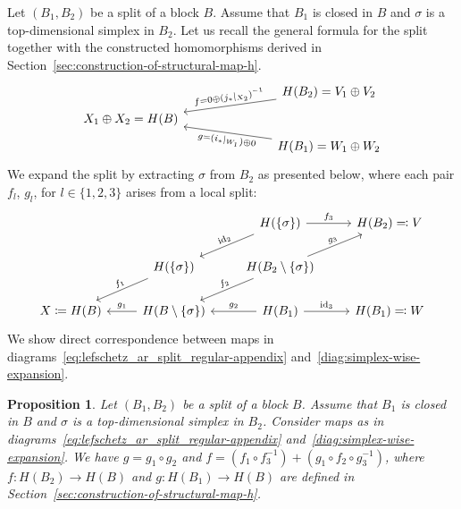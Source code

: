\documentclass[letterpaper,11pt]{article}
\theoremstyle{plain}
\newtheorem{proposition}[theorem]{Proposition}
\theoremstyle{definition}
\newcommand{\id}{\operatorname{id}}
\newcounter{li}
\newcommand{\bl}{B}
\begin{document}
Let $(B_1, B_2)$ be a split of a block $B$.
Assume that $B_1$ is closed in $B$ and $\sigma$ is a top-dimensional simplex in $B_2$. 
Let us recall the general formula for the split together with the constructed homomorphisms derived in Section~\ref{sec:construction-of-structural-map-h}.
\begin{equation}\label{eq:lefschetz_ar_split_regular-appendix}
    \begin{tikzcd}[row sep=tiny, column sep=2.5cm]
        & H(\bl_2)=V_1\oplus V_2\arrow[ld, "f=0\oplus (j_\ast|_{X_2})^{-1}",sloped]\\
        X_1\oplus X_2 = H(\bl) & \\
        & H(\bl_1)=W_1\oplus W_2\arrow[lu, "g=(i_\ast|_{W_1})\oplus 0",swap, sloped]
    \end{tikzcd}
\end{equation}
We expand the split by extracting $\sigma$ from $B_2$ as presented below, 
    where each pair $f_l$, $g_l$, for $l\in\{1,2,3\}$ arises from a local split:
\begin{equation}\label{diag:simplex-wise-expansion}
    \begin{tikzcd}%
        & & H(\{\sigma\})\arrow[ld, "\id_2", sloped]\arrow[r, "f_3"] & H(B_2)\eqqcolon V \\
        & H(\{\sigma\})\arrow[ld, "f_1", sloped] & H(B_2\setminus\{\sigma\})\arrow[ld, "f_2", sloped]\arrow[ru, "g_3", sloped] & \\
        X\coloneqq H(B) & H(B\setminus\{\sigma\})\arrow[l, "g_1", swap] & H(B_1)\arrow[l, "g_2", swap]\arrow[r, "\id_3"] & H(B_1)\eqqcolon W
    \end{tikzcd}
\end{equation}
We show direct correspondence between maps in diagrams~\eqref{eq:lefschetz_ar_split_regular-appendix} and~\eqref{diag:simplex-wise-expansion}.

\begin{proposition}\label{prop:single-step-of-the-expansion}
    Let $(B_1, B_2)$ be a split of a block $B$.
    Assume that $B_1$ is closed in $B$ and $\sigma$ is a top-dimensional simplex in $B_2$. 
    Consider maps as in diagrams~\eqref{eq:lefschetz_ar_split_regular-appendix} and~\eqref{diag:simplex-wise-expansion}.
    We have $g= g_1\circ g_2$ and $f=(f_1\circ f_3^{-1}) + (g_1\circ f_2\circ g_3^{-1})$,
    where $f:H(B_2)\rightarrow H(B)$ and $g:H(B_1)\rightarrow H(B)$ are defined in Section~\ref{sec:construction-of-structural-map-h}.
\end{proposition}
\end{document}
